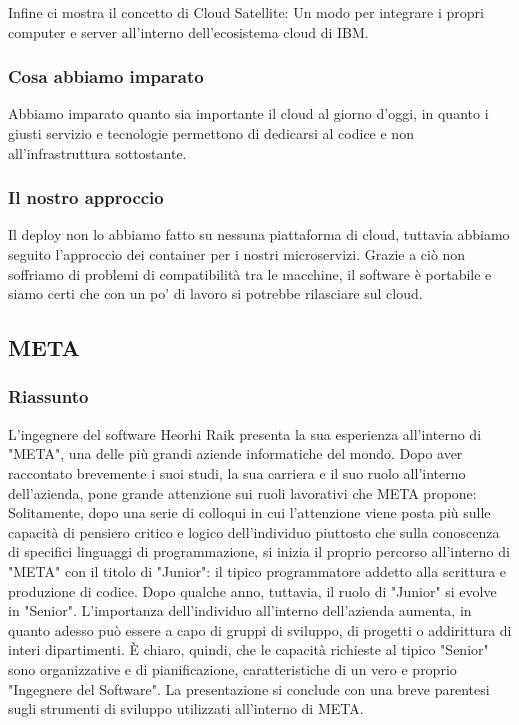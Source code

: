 \documentclass{report}
\begin{document}
Infine ci mostra il concetto di Cloud Satellite: Un modo per integrare i propri computer e server all'interno dell'ecosistema cloud di IBM.
\subsubsection*{Cosa abbiamo imparato}
Abbiamo imparato quanto sia importante il cloud al giorno d'oggi, in quanto i giusti servizio e tecnologie permettono di dedicarsi al codice e non all'infrastruttura sottostante.
\subsubsection*{Il nostro approccio}
Il deploy non lo abbiamo fatto su nessuna piattaforma di cloud, tuttavia abbiamo seguito l'approccio dei container per i nostri microservizi. 
Grazie a ciò non soffriamo di problemi di compatibilità tra le macchine, il software è portabile e siamo certi che con un po' di lavoro si potrebbe rilasciare sul cloud.

\subsection{META}
\subsubsection*{Riassunto}
L'ingegnere del software Heorhi Raik presenta la sua esperienza all'interno di "META", una delle più grandi aziende informatiche del mondo. Dopo aver raccontato brevemente i suoi studi, la sua carriera e il suo ruolo all'interno dell'azienda, pone grande attenzione sui ruoli lavorativi che META propone:
Solitamente, dopo una serie di colloqui in cui l'attenzione viene posta più sulle capacità di pensiero critico e logico dell'individuo piuttosto che sulla conoscenza di specifici linguaggi di programmazione, si inizia il proprio percorso all'interno di "META" con il titolo di "Junior": il tipico programmatore addetto alla scrittura e produzione di codice. Dopo qualche anno, tuttavia, il ruolo di "Junior" si evolve in "Senior". L'importanza dell'individuo all'interno dell'azienda aumenta, in quanto adesso può essere a capo di gruppi di sviluppo, di progetti o addirittura di interi dipartimenti. È chiaro, quindi, che le capacità richieste al tipico "Senior" sono organizzative e di pianificazione, caratteristiche di un vero e proprio "Ingegnere del Software".
La presentazione si conclude con una breve parentesi sugli strumenti di sviluppo utilizzati all'interno di META.
\end{document}
